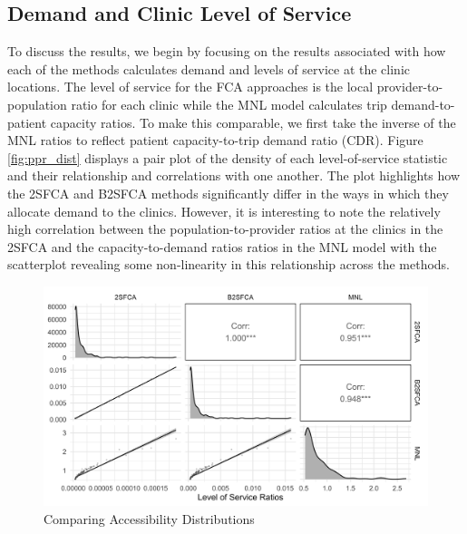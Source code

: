 \documentclass{article}
\begin{document}
\hypertarget{demand-and-clinic-level-of-service}{%
\subsection{Demand and Clinic Level of
Service}\label{demand-and-clinic-level-of-service}}

To discuss the results, we begin by focusing on the results associated
with how each of the methods calculates demand and levels of service at
the clinic locations. The level of service for the FCA approaches is the
local provider-to-population ratio for each clinic while the MNL model
calculates trip demand-to-patient capacity ratios. To make this
comparable, we first take the inverse of the MNL ratios to reflect
patient capacity-to-trip demand ratio (CDR). Figure \ref{fig:ppr_dist}
displays a pair plot of the density of each level-of-service statistic
and their relationship and correlations with one another. The plot
highlights how the 2SFCA and B2SFCA methods significantly differ in the
ways in which they allocate demand to the clinics. However, it is
interesting to note the relatively high correlation between the
population-to-provider ratios at the clinics in the 2SFCA and the
capacity-to-demand ratios ratios in the MNL model with the scatterplot
revealing some non-linearity in this relationship across the methods.

\begin{figure}
\includegraphics[width=1\linewidth]{./img/pair_plot_ppr} \caption{\label{fig:ppr_dist}Comparing Accessibility Distributions}\label{fig:ppr_dist_fig}
\end{figure}
\end{document}

